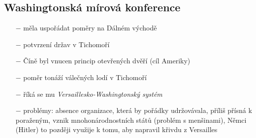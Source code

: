 \documentclass{article}
\begin{document}
\subsection*{Washingtonská mírová konference}
\begin{itemize}
    \vspace{-0.5em}
    \setlength\itemsep{0.15em}
    \item[$-$] měla uspořádat poměry na Dálném východě
    \item[$-$] potvrzení držav v Tichomoří
    \item[$-$] Číně byl vnucen princip otevřených dvěří (cíl Ameriky)
    \item[$-$] poměr tonáží válečných lodí v Tichomoří
    \item[$-$] říká se mu \textit{Versaillesko-Washingtonský systém}
    \item[$-$] problémy: absence organizace, která by pořádky udržovávala, příliš přísná k poraženým, vznik mnohonárodnostních států (problém s menšinami), Němci (Hitler) to později využije k tomu, aby napravil křivdu z Versailles
\end{itemize}
\end{document}
